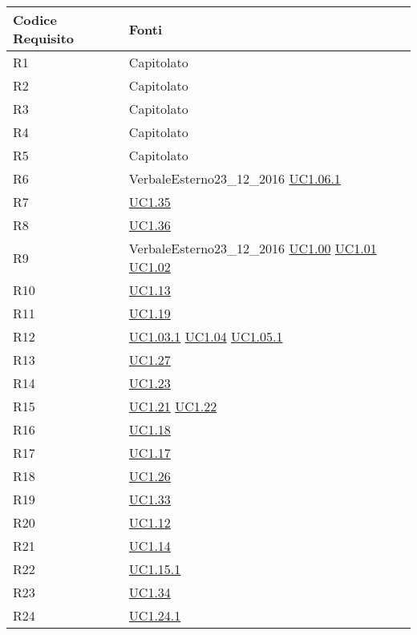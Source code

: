 \begin{longtable}{|P{6cm}|P{6cm}|}
	\hline \textbf{Codice Requisito} & \textbf{Fonti}\\
	\hline R1 & Capitolato \\
	\hline R2 & Capitolato \\
	\hline R3 & Capitolato \\
	\hline R4 & Capitolato \\
	\hline R5 & Capitolato \\
	\hline R6 & VerbaleEsterno23\_12\_2016 \linebreak \hyperref[UC1.06.1]{UC1.06.1}  \\	
	\hline R7 & \hyperref[UC1.35]{UC1.35} \\
	\hline R8 & \hyperref[UC1.36]{UC1.36} \\
	\hline R9 & VerbaleEsterno23\_12\_2016 \linebreak \hyperref[UC1.00]{UC1.00} \linebreak \hyperref[UC1.01]{UC1.01} \linebreak \hyperref[UC1.02]{UC1.02} \\
	\hline R10 & \hyperref[UC1.13]{UC1.13} \\
	\hline R11 & \hyperref[UC1.19]{UC1.19} \\
	\hline R12 & \hyperref[UC1.03.1]{UC1.03.1} \linebreak \hyperref[UC1.04]{UC1.04} \linebreak \hyperref[UC1.05.1]{UC1.05.1} \\
	\hline R13 & \hyperref[UC1.27]{UC1.27} \\
	\hline R14 & \hyperref[UC1.23]{UC1.23} \\
	\hline R15 & \hyperref[UC1.21]{UC1.21} \linebreak \hyperref[UC1.22]{UC1.22} \\
	\hline R16 & \hyperref[UC1.18]{UC1.18} \\
	\hline R17 & \hyperref[UC1.17]{UC1.17} \\
	\hline R18 & \hyperref[UC1.26]{UC1.26} \\
	\hline R19 & \hyperref[UC1.33]{UC1.33} \\
	\hline R20 & \hyperref[UC1.12]{UC1.12} \\
	\hline R21 & \hyperref[UC1.14]{UC1.14} \\
	\hline R22 & \hyperref[UC1.15.1]{UC1.15.1} \\
	\hline R23 & \hyperref[UC1.34]{UC1.34} \\
	\hline R24 & \hyperref[UC1.24.1]{UC1.24.1} \\

\end{longtable}
